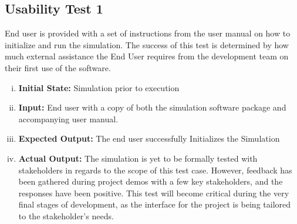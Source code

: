 \documentclass[paper=letter, fontsize=10pt]{scrartcl}
\numberwithin{equation}{section}		%
\numberwithin{figure}{section}			%
\numberwithin{table}{section}				%
\begin{document}
\subsection{Usability Test 1}
End user is provided with a set of instructions from the user manual on how to initialize and run the simulation. The success of this test is determined by how much external assistance the End User requires from the development team on their first use of the software. 
\begin{enumerate}[(i)]
	\item \textbf{Initial State:} Simulation prior to execution
	\item \textbf{Input:} End user with a copy of both the simulation software package and accompanying user manual.
	\item \textbf{Expected Output:} The end user successfully Initializes the Simulation
	\item \textbf{Actual Output:} The simulation is yet to be formally tested with stakeholders in regards to the scope of this test case. However, feedback has been gathered during project demos with a few key stakeholders, and the responses have been positive. This test will become critical during the very final stages of development, as the interface for the project is being tailored to the stakeholder's needs.
\end{enumerate}
\end{document}
